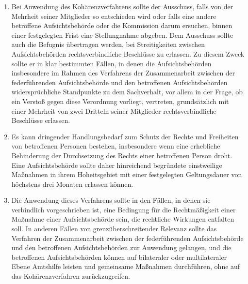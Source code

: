 \begin{enumerate}

   \item Bei Anwendung des Kohärenzverfahrens sollte der Ausschuss, falls von der Mehrheit seiner Mitglieder so
    entschieden wird oder falls eine andere betroffene Aufsichtsbehörde oder die Kommission darum ersuchen, binnen
    einer festgelegten Frist eine Stellungnahme abgeben. Dem Ausschuss sollte auch die Befugnis übertragen werden, bei
    Streitigkeiten zwischen Aufsichtsbehörden rechtsverbindliche Beschlüsse zu erlassen. Zu diesem Zweck sollte er in
    klar bestimmten Fällen, in denen die Aufsichtsbehörden insbesondere im Rahmen des Verfahrens der Zusammenarbeit
    zwischen der federführenden Aufsichtsbehörde und den betroffenen Aufsichtsbehörden widersprüchliche Standpunkte zu
    dem Sachverhalt, vor allem in der Frage, ob ein Verstoß gegen diese Verordnung vorliegt, vertreten, grundsätzlich
    mit einer Mehrheit von zwei Dritteln seiner Mitglieder rechtsverbindliche Beschlüsse erlassen.%
   \label{itm:eg-136}
   

   \item Es kann dringender Handlungsbedarf zum Schutz der Rechte und Freiheiten von betroffenen Personen bestehen,
    insbesondere wenn eine erhebliche Behinderung der Durchsetzung des Rechts einer betroffenen Person droht. Eine
    Aufsichtsbehörde sollte daher hinreichend begründete einstweilige Maßnahmen in ihrem Hoheitsgebiet mit einer
    festgelegten Geltungsdauer von höchstens drei Monaten erlassen können.%
   \label{itm:eg-137}
   

   \item Die Anwendung dieses Verfahrens sollte in den Fällen, in denen sie verbindlich vorgeschrieben ist, eine
    Bedingung für die Rechtmäßigkeit einer Maßnahme einer Aufsichtsbehörde sein, die rechtliche Wirkungen entfalten
    soll. In anderen Fällen von grenzüberschreitender Relevanz sollte das Verfahren der Zusammenarbeit zwischen der
    federführenden Aufsichtsbehörde und den betroffenen Aufsichtsbehörden zur Anwendung gelangen, und die betroffenen
    Aufsichtsbehörden können auf bilateraler oder multilateraler Ebene Amtshilfe leisten und gemeinsame Maßnahmen
    durchführen, ohne auf das Kohärenzverfahren zurückzugreifen.%
   \label{itm:eg-138}
   


\end{enumerate}
